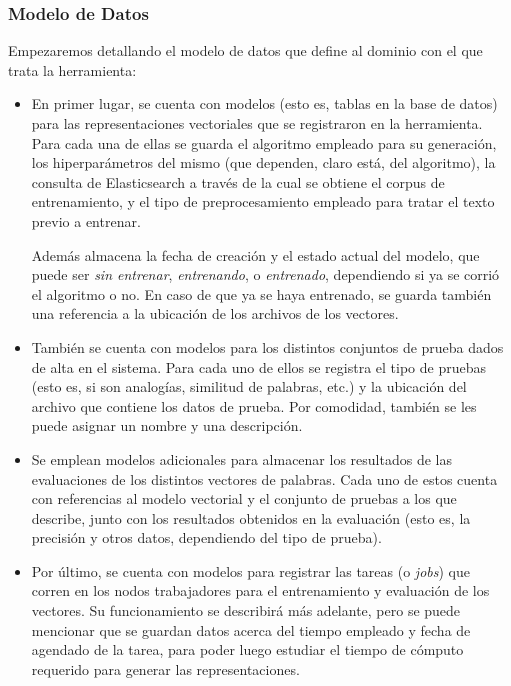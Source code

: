 \subsubsection{Modelo de Datos}

Empezaremos detallando el modelo de datos que define al dominio con el que trata la herramienta:

\begin{itemize}

\item En primer lugar, se cuenta con modelos (esto es, tablas en la base de datos) para las
representaciones vectoriales que se registraron en la herramienta. Para cada una de ellas se guarda
el algoritmo empleado para su generación, los hiperparámetros del mismo (que dependen, claro está,
del algoritmo), la consulta de Elasticsearch a través de la cual se obtiene el corpus de
entrenamiento, y el tipo de preprocesamiento empleado para tratar el texto previo a entrenar.

Además almacena la fecha de creación y el estado actual del modelo, que puede ser \textit{sin
entrenar}, \textit{entrenando}, o \textit{entrenado}, dependiendo si ya se corrió el algoritmo o
no. En caso de que ya se haya entrenado, se guarda también una referencia a la ubicación de los
archivos de los vectores.

\item También se cuenta con modelos para los distintos conjuntos de prueba dados de alta en el
sistema. Para cada uno de ellos se registra el tipo de pruebas (esto es, si son analogías, similitud
de palabras, etc.) y la ubicación del archivo que contiene los datos de prueba. Por comodidad,
también se les puede asignar un nombre y una descripción.

\item Se emplean modelos adicionales para almacenar los resultados de las evaluaciones de los
distintos vectores de palabras. Cada uno de estos cuenta con referencias al modelo vectorial y el
conjunto de pruebas a los que describe, junto con los resultados obtenidos en la evaluación (esto
es, la precisión y otros datos, dependiendo del tipo de prueba).

\item Por último, se cuenta con modelos para registrar las tareas (o \textit{jobs}) que corren en
los nodos trabajadores para el entrenamiento y evaluación de los vectores. Su funcionamiento se
describirá más adelante, pero se puede mencionar que se guardan datos acerca del tiempo empleado y
fecha de agendado de la tarea, para poder luego estudiar el tiempo de cómputo requerido para generar
las representaciones.

\end{itemize}


